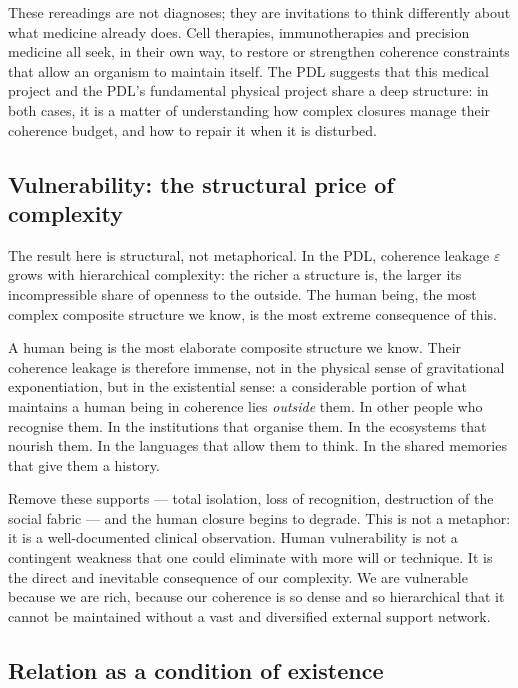 \documentclass[12pt, a4paper, openright]{book}
\begin{document}
\medskip

These rereadings are not diagnoses; they are invitations to think differently about what medicine already does. Cell therapies, immunotherapies and precision medicine all seek, in their own way, to restore or strengthen coherence constraints that allow an organism to maintain itself. The PDL suggests that this medical project and the PDL’s fundamental physical project share a deep structure: in both cases, it is a matter of understanding how complex closures manage their coherence budget, and how to repair it when it is disturbed.

\subsection*{Vulnerability: the structural price of complexity}

The result here is structural, not metaphorical. In the PDL, coherence leakage $\varepsilon$ grows with hierarchical complexity: the richer a structure is, the larger its incompressible share of openness to the outside. The human being, the most complex composite structure we know, is the most extreme consequence of this.

\medskip

A human being is the most elaborate composite structure we know. Their coherence leakage is therefore immense, not in the physical sense of gravitational exponentiation, but in the existential sense: a considerable portion of what maintains a human being in coherence lies \emph{outside} them. In other people who recognise them. In the institutions that organise them. In the ecosystems that nourish them. In the languages that allow them to think. In the shared memories that give them a history.

\medskip

Remove these supports — total isolation, loss of recognition, destruction of the social fabric — and the human closure begins to degrade. This is not a metaphor: it is a well-documented clinical observation. Human vulnerability is not a contingent weakness that one could eliminate with more will or technique. It is the direct and inevitable consequence of our complexity. We are vulnerable because we are rich, because our coherence is so dense and so hierarchical that it cannot be maintained without a vast and diversified external support network.

\subsection*{Relation as a condition of existence}
\end{document}

